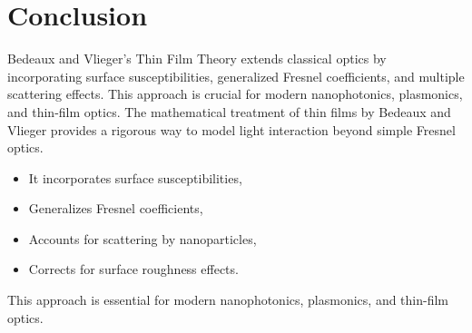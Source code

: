 \documentclass{article}
\begin{document}
	\section{Conclusion}
	Bedeaux and Vlieger’s Thin Film Theory extends classical optics by incorporating surface susceptibilities, generalized Fresnel coefficients, and multiple scattering effects. This approach is crucial for modern nanophotonics, plasmonics, and thin-film optics. The mathematical treatment of thin films by Bedeaux and Vlieger provides a rigorous way to model light interaction beyond simple Fresnel optics.
	\begin{itemize}
		\item It incorporates surface susceptibilities,
		\item	Generalizes Fresnel coefficients,
		\item Accounts for scattering by nanoparticles,
		\item Corrects for surface roughness effects.
	\end{itemize}
	
	This approach is essential for modern nanophotonics, plasmonics, and thin-film optics.
		
	
	
	
	
\end{document}

